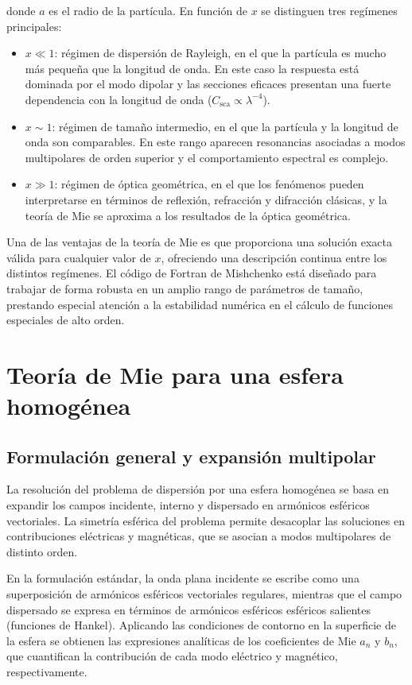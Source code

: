 \documentclass[12pt,a4paper]{article}
\begin{document}
donde $a$ es el radio de la partícula.
En función de $x$ se distinguen tres regímenes principales:

\begin{itemize}
  \item $x \ll 1$: régimen de dispersión de Rayleigh, en el que la partícula es mucho más pequeña que la longitud de onda. En este caso la respuesta está dominada por el modo dipolar y las secciones eficaces
        presentan una fuerte dependencia con la longitud de onda ($C_{\text{sca}} \propto \lambda^{-4}$).
  \item $x \sim 1$: régimen de tamaño intermedio, en el que la partícula y la longitud de onda son comparables. En este rango aparecen resonancias asociadas a modos multipolares de orden superior
        y el comportamiento espectral es complejo.
  \item $x \gg 1$: régimen de óptica geométrica, en el que los fenómenos pueden interpretarse en términos de reflexión, refracción y difracción clásicas, y la teoría de Mie se aproxima a los resultados
        de la óptica geométrica.
\end{itemize}

Una de las ventajas de la teoría de Mie es que proporciona una solución exacta válida para cualquier valor de $x$, ofreciendo una descripción continua entre los distintos regímenes.
El código de Fortran de Mishchenko está diseñado para trabajar de forma robusta en un amplio rango de parámetros de tamaño, prestando especial atención a la estabilidad numérica
en el cálculo de funciones especiales de alto orden.



\section{Teoría de Mie para una esfera homogénea}

\subsection{Formulación general y expansión multipolar}

La resolución del problema de dispersión por una esfera homogénea se basa en expandir los campos incidente, interno y dispersado en armónicos esféricos vectoriales.
La simetría esférica del problema permite desacoplar las soluciones en contribuciones eléctricas y magnéticas, que se asocian a modos multipolares de distinto orden.

En la formulación estándar, la onda plana incidente se escribe como una superposición de armónicos esféricos vectoriales regulares, mientras que el campo dispersado se expresa en términos
de armónicos esféricos esféricos salientes (funciones de Hankel).
Aplicando las condiciones de contorno en la superficie de la esfera se obtienen las expresiones analíticas de los coeficientes de Mie $a_n$ y $b_n$, que cuantifican la contribución
de cada modo eléctrico y magnético, respectivamente.
\end{document}
